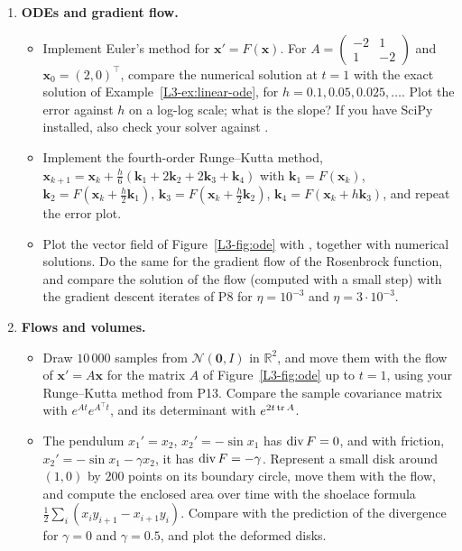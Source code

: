 \begin{enumerate}[label=\textbf{P\arabic*.}, leftmargin=*]
    \item \textbf{ODEs and gradient flow.}
    \begin{itemize}
        \item Implement Euler's method for $\mathbf{x}' = F(\mathbf{x})$. For $A = \begin{pmatrix} -2 & 1 \\ 1 & -2 \end{pmatrix}$ and $\mathbf{x}_0 = (2, 0)^\top$, compare the numerical solution at $t = 1$ with the exact solution of Example~\ref{L3-ex:linear-ode}, for $h = 0.1, 0.05, 0.025, \ldots$. Plot the error against $h$ on a log-log scale; what is the slope? If you have SciPy installed, also check your solver against .
        \item Implement the fourth-order Runge--Kutta method, $\mathbf{x}_{k+1} = \mathbf{x}_k + \frac{h}{6}(\mathbf{k}_1 + 2\mathbf{k}_2 + 2\mathbf{k}_3 + \mathbf{k}_4)$ with $\mathbf{k}_1 = F(\mathbf{x}_k)$, $\mathbf{k}_2 = F(\mathbf{x}_k + \frac{h}{2}\mathbf{k}_1)$, $\mathbf{k}_3 = F(\mathbf{x}_k + \frac{h}{2}\mathbf{k}_2)$, $\mathbf{k}_4 = F(\mathbf{x}_k + h\mathbf{k}_3)$, and repeat the error plot.
        \item Plot the vector field of Figure~\ref{L3-fig:ode} with , together with numerical solutions. Do the same for the gradient flow of the Rosenbrock function, and compare the solution of the flow (computed with a small step) with the gradient descent iterates of P8 for $\eta = 10^{-3}$ and $\eta = 3 \cdot 10^{-3}$.
    \end{itemize}

    \item \textbf{Flows and volumes.}
    \begin{itemize}
        \item Draw $10\,000$ samples from $\mathcal{N}(\mathbf{0}, I)$ in $\mathbb{R}^2$, and move them with the flow of $\mathbf{x}' = A\mathbf{x}$ for the matrix $A$ of Figure~\ref{L3-fig:ode} up to $t = 1$, using your Runge--Kutta method from P13. Compare the sample covariance matrix with $e^{At}e^{A^\top t}$, and its determinant with $e^{2t\operatorname{tr} A}$.
        \item The pendulum $x_1' = x_2$, $x_2' = -\sin x_1$ has $\operatorname{div} F = 0$, and with friction, $x_2' = -\sin x_1 - \gamma x_2$, it has $\operatorname{div} F = -\gamma$. Represent a small disk around $(1, 0)$ by $200$ points on its boundary circle, move them with the flow, and compute the enclosed area over time with the shoelace formula $\frac{1}{2}\sum_i (x_iy_{i+1} - x_{i+1}y_i)$. Compare with the prediction of the divergence for $\gamma = 0$ and $\gamma = 0.5$, and plot the deformed disks.
    \end{itemize}


\end{enumerate}
